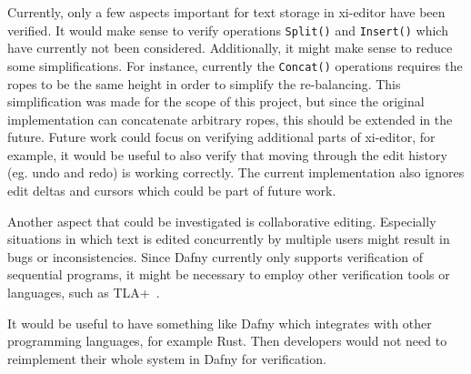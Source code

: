 Currently, only a few aspects important for text storage in xi-editor have been verified.
It would make sense to verify operations \texttt{Split()} and \texttt{Insert()} which have currently not been considered.
Additionally, it might make sense to reduce some simplifications. 
For instance, currently the \texttt{Concat()} operations requires the ropes to be the same height in order to simplify the re-balancing. 
This simplification was made for the scope of this project, but since the original implementation can concatenate arbitrary ropes, this should be extended in the future.
Future work could focus on verifying additional parts of xi-editor, for example, it would be useful to also verify that moving through the edit history (eg. undo and redo) is working correctly.
The current implementation also ignores edit deltas and cursors which could be part of future work.

Another aspect that could be investigated is collaborative editing.
Especially situations in which text is edited concurrently by multiple users might result in bugs or inconsistencies.
Since Dafny currently only supports verification of sequential programs, it might be necessary to employ other verification tools or languages, such as TLA+~\cite{chaudhuri2010verifying}.

It would be useful to have something like Dafny which integrates with other programming languages, for example Rust.
Then developers would not need to reimplement their whole system in Dafny for verification.